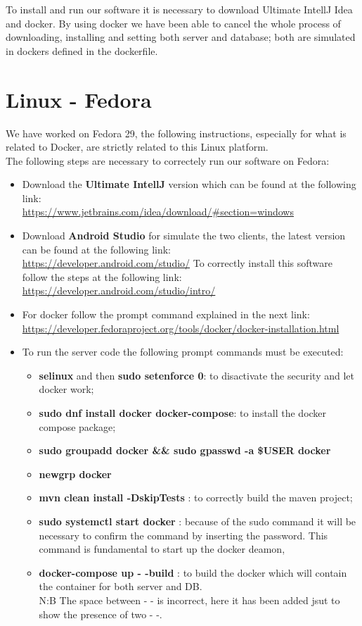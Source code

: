 To install and run our software it is necessary to download Ultimate IntellJ Idea and docker. By using docker we have been able to cancel the whole process of downloading, installing and setting both server and database; both are simulated in dockers defined in the dockerfile.

\section{Linux - Fedora}
We have worked on Fedora 29, the following instructions, especially for what is related to Docker, are strictly related to this Linux platform.\\
The following steps are necessary to correctely run our software on Fedora:
\begin{itemize}
	\item Download the \textbf{Ultimate IntellJ} version which can be found at the following link:\\
 		\url{https://www.jetbrains.com/idea/download/#section=windows}

	\item Download \textbf{Android Studio} for simulate the two clients, the latest version can be found at the following link:\\
		\url{https://developer.android.com/studio/}
		To correctly install this software follow the steps at the following link:\\
		\url{https://developer.android.com/studio/intro/}

	\item For docker follow the prompt command explained in the next link:\\
		\url{https://developer.fedoraproject.org/tools/docker/docker-installation.html}\\


	\item To run the server code the following prompt commands must be executed:\\
		\begin{itemize}
			\item \textbf{selinux} and then \textbf{sudo setenforce 0}: to disactivate the security and let docker work;
			\item \textbf{sudo dnf install docker docker-compose}: to install the docker compose package;
			\item \textbf{sudo groupadd docker \&\& sudo gpasswd -a \${USER} docker}
			\item \textbf{newgrp docker}
			\item \textbf{ mvn clean install -DskipTests} : to correctly build the maven project;
			\item \textbf{ sudo systemctl start docker} : because of the sudo command it will be necessary to confirm the 					command by inserting the password. This command is fundamental to start up the docker deamon,	
			\item \textbf{ docker-compose up - -build} : to build the docker which will contain the container for both server 					and DB.\\N:B The space between - - is incorrect, here it has been added jsut to show the presence of two - -.
		\end{itemize}


\end{itemize}
